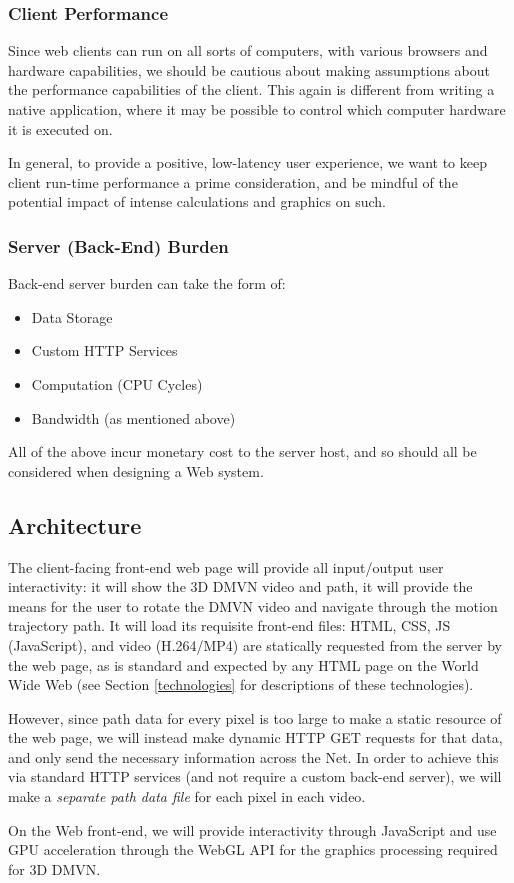 \subsubsection{Client Performance}
Since web clients can run on all sorts of computers, with various browsers and hardware capabilities, we should be cautious about making assumptions about the performance capabilities of the client. This again is different from writing a native application, where it may be possible to control which computer hardware it is executed on.
\par In general, to provide a positive, low-latency user experience, we want to keep client run-time performance a prime consideration, and be mindful of the potential impact of intense calculations and graphics on such.

\subsubsection{Server (Back-End) Burden}
Back-end server burden can take the form of:
\begin{itemize}
    \item Data Storage
    \item Custom HTTP Services
    \item Computation (CPU Cycles)
    \item Bandwidth (as mentioned above)
\end{itemize}
All of the above incur monetary cost to the server host, and so should all be considered when designing a Web system.


\subsection {Architecture}
The client-facing front-end web page will provide all input/output user interactivity: it will show the 3D DMVN video and path, it will provide the means for the user to rotate the DMVN video and navigate through the motion trajectory path. It will load its requisite front-end files: HTML, CSS, JS (JavaScript), and video (H.264/MP4) are statically requested from the server by the web page, as is standard and expected by any HTML page on the World Wide Web (see Section \ref{technologies} for descriptions of these technologies).
\par However, since path data for every pixel is too large to make a static resource of the web page, we will instead make dynamic HTTP GET requests for that data, and only send the necessary information across the Net. In order to achieve this via standard HTTP services (and not require a custom back-end server), we will make a \emph{separate path data file} for each pixel in each video.
\par On the Web front-end, we will provide interactivity through JavaScript and use GPU acceleration through the WebGL API for the graphics processing required for 3D DMVN.

